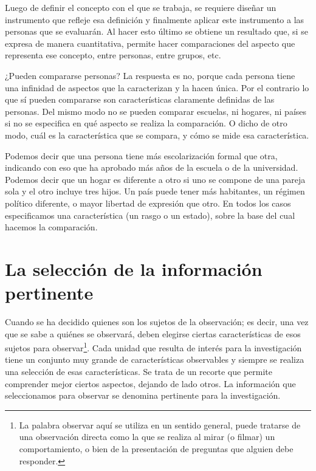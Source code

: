 \documentclass[]{book}
\let\rmarkdownfootnote\footnote%
\def\footnote{\protect\rmarkdownfootnote}
\begin{document}
Luego de definir el concepto con el que se trabaja, se requiere diseñar un instrumento que refleje esa definición y finalmente aplicar este instrumento a las personas que se evaluarán. Al hacer esto último se obtiene un resultado que, si se expresa de manera cuantitativa, permite hacer comparaciones del aspecto que representa ese concepto, entre personas, entre grupos, etc.

¿Pueden compararse personas? La respuesta es no, porque cada persona tiene una infinidad de aspectos que la caracterizan y la hacen única. Por el contrario lo que sí pueden compararse son características claramente definidas de las personas. Del mismo modo no se pueden comparar escuelas, ni hogares, ni países si no se especifica en qué aspecto se realiza la comparación. O dicho de otro modo, cuál es la característica que se compara, y cómo se mide esa característica.

Podemos decir que una persona tiene más escolarización formal que otra, indicando con eso que ha aprobado más años de la escuela o de la universidad. Podemos decir que un hogar es diferente a otro si uno se compone de una pareja sola y el otro incluye tres hijos. Un país puede tener más habitantes, un régimen político diferente, o mayor libertad de expresión que otro. En todos los casos especificamos una característica (un rasgo o un estado), sobre la base del cual hacemos la comparación.

\hypertarget{la-selecciuxf3n-de-la-informaciuxf3n-pertinente}{%
\section{La selección de la información pertinente}\label{la-selecciuxf3n-de-la-informaciuxf3n-pertinente}}

Cuando se ha decidido quienes son los sujetos de la observación; es decir, una vez que se sabe a quiénes se observará, deben elegirse ciertas características de esos sujetos para observar\footnote{La palabra observar aquí se utiliza en un sentido general, puede tratarse de una observación directa como la que se realiza al mirar (o filmar) un comportamiento, o bien de la presentación de preguntas que alguien debe responder.}. Cada unidad que resulta de interés para la investigación tiene un conjunto muy grande de características observables y siempre se realiza una selección de esas características. Se trata de un recorte que permite comprender mejor ciertos aspectos, dejando de lado otros. La información que seleccionamos para observar se denomina pertinente para la investigación.
\end{document}
